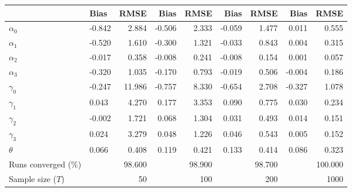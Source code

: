 
\begin{tabular}[t]{llrrrrrrr}
\toprule
  & Bias & RMSE & Bias & RMSE & Bias & RMSE & Bias & RMSE\\
\midrule
$\alpha_{0}$ & -0.842 & 2.884 & -0.506 & 2.333 & -0.059 & 1.477 & 0.011 & 0.555\\
$\alpha_{1}$ & -0.520 & 1.610 & -0.300 & 1.321 & -0.033 & 0.843 & 0.004 & 0.315\\
$\alpha_{2}$ & -0.017 & 0.358 & -0.008 & 0.241 & -0.008 & 0.154 & 0.001 & 0.057\\
$\alpha_{3}$ & -0.320 & 1.035 & -0.170 & 0.793 & -0.019 & 0.506 & -0.004 & 0.186\\
$\gamma_{0}$ & -0.247 & 11.986 & -0.757 & 8.330 & -0.654 & 2.708 & -0.327 & 1.078\\
$\gamma_{1}$ & 0.043 & 4.270 & 0.177 & 3.353 & 0.090 & 0.775 & 0.030 & 0.234\\
$\gamma_{2}$ & -0.002 & 1.721 & 0.068 & 1.304 & 0.031 & 0.493 & 0.014 & 0.151\\
$\gamma_{3}$ & 0.024 & 3.279 & 0.048 & 1.226 & 0.046 & 0.543 & 0.005 & 0.152\\
$\theta$ & 0.066 & 0.408 & 0.119 & 0.421 & 0.133 & 0.414 & 0.086 & 0.323\\
Runs converged (\%) &  & 98.600 &  & 98.900 &  & 98.700 &  & 100.000\\
Sample size ($T$) &  & 50 &  & 100 &  & 200 &  & 1000\\
\bottomrule
\end{tabular}
